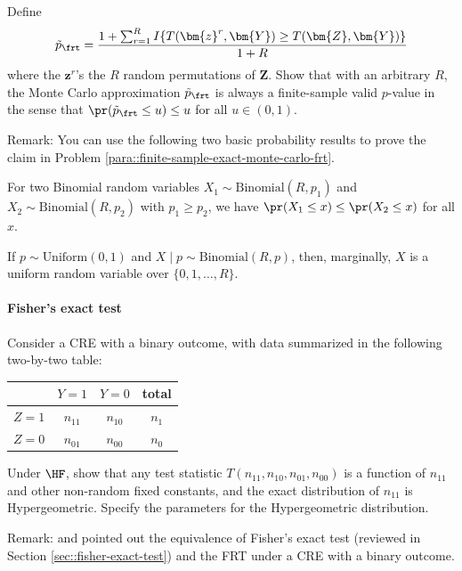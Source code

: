 Define 
$$
\tilde p_\frt  =  \frac{  1 + \sum_{r=1}^R   I\{ T(\bm{z}^r,\bm{Y})   \geq T(\bm{Z},\bm{Y})   \}  }{1+R}
$$ 
where the $\bm{z}^r$'s the $R$ random permutations of $\bm{Z}$. Show that with an arbitrary $R$, the Monte Carlo approximation $\tilde p_\frt $ is always a finite-sample valid $p$-value in the sense that $\pr(\tilde p_\frt \leq u) \leq u$ for all $u\in (0,1)$.


 
Remark: You can use the following two basic probability results to prove the claim in Problem \ref{para::finite-sample-exact-monte-carlo-frt}. 


\begin{lemma}
\label{lemma::binomial-order}
For two Binomial random variables $X_1\sim \text{Binomial}(R, p_1)$ and $X_2\sim \text{Binomial}(R, p_2)$ with $p_1\geq p_2$, we have  $\pr(X_1\leq x) \leq  \pr(X_2\leq x) $ for all $x.$
\end{lemma}

\begin{lemma}
\label{lemma::uniform}
If $p\sim \text{Uniform}(0,1)$ and $X\mid p \sim \text{Binomial}(R, p)$, then, marginally, $X$ is a uniform random variable over $\{ 0,1,\ldots, R  \}$. 
\end{lemma}

 


\paragraph{Fisher's exact test}
\label{hw::frt-fisherexacttest}

Consider a CRE with a binary outcome, with data summarized in the following two-by-two table:
 \begin{center}
\begin{tabular}{lccc}
\hline 
        & $Y =1$ & $Y =0$& total\\\hline
$Z =1$ & $n_{11}$ & $n_{10}$ & $n_1$\\ 
$Z =0$ & $n_{01}$ & $n_{00}$ & $n_0$\\ 
\hline 
\end{tabular}
\end{center}
Under $\HF$, show that any test statistic $T(n_{11}, n_{10}, n_{01}, n_{00})$ is a function of $n_{11}$ and other non-random fixed constants, and the exact distribution of $n_{11}$ is Hypergeometric. Specify the parameters for the Hypergeometric distribution. 

Remark: 
\citet{barnard1947significance} and \citet{Ding:2015} pointed out the equivalence of Fisher's exact test (reviewed in Section \ref{sec::fisher-exact-test}) and the FRT under a CRE  with a binary outcome. 





